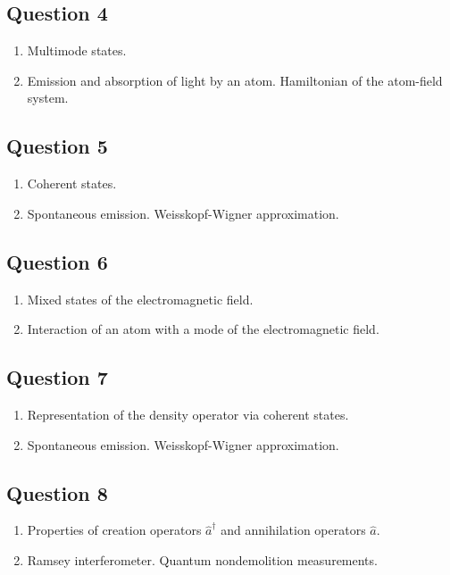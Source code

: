 \documentclass[12pt,a4paper]{article}
\begin{document}
\subsection*{Question 4} 
\begin{enumerate}
\item Multimode states.
\item Emission and absorption of light by an atom.
Hamiltonian of the atom-field system.
\end{enumerate}

\subsection*{Question 5} 
\begin{enumerate}
\item Coherent states.
\item Spontaneous emission. Weisskopf-Wigner approximation.
\end{enumerate}

\subsection*{Question 6} 
\begin{enumerate}
\item Mixed states of the electromagnetic field.
\item Interaction of
an atom with a mode of the electromagnetic field.
\end{enumerate}

\subsection*{Question 7} 
\begin{enumerate}
\item Representation of the density operator via coherent
  states.
\item Spontaneous emission. Weisskopf-Wigner approximation.
\end{enumerate}

\subsection*{Question 8} 
\begin{enumerate}
\item Properties of creation operators $\hat{a}^\dag$ and annihilation operators $\hat{a}$.
\item Ramsey interferometer. Quantum nondemolition measurements.
\end{enumerate}
\end{document}

